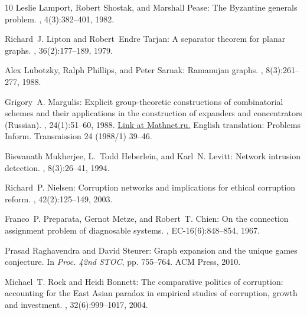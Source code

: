\documentclass[11pt]{article}
\numberwithin{equation}{section}
\theoremstyle{definition}
\theoremstyle{plain}
\begin{document}
\begin{thebibliography}{10}
{\sc Leslie Lamport, Robert Shostak, and Marshall Pease}: The {B}yzantine
  generals problem.
, 4(3):382--401, 1982.
\newblock [\epfmtdoi{10.1145/357172.357176}]

{\sc Richard~J. Lipton and Robert~Endre Tarjan}: A separator theorem for planar
  graphs.
, 36(2):177--189, 1979.
\newblock [\epfmtdoi{10.1137/0136016}]

{\sc Alex Lubotzky, Ralph Phillips, and Peter Sarnak}: Ramanujan graphs.
, 8(3):261--277, 1988.
\newblock [\epfmtdoi{10.1007/BF02126799}]

{\sc Grigory~A. Margulis}: Explicit group-theoretic constructions of
  combinatorial schemes and their applications in the construction of expanders
  and concentrators ({R}ussian).
, 24(1):51--60, 1988.
\newblock
  \href{http://www.mathnet.ru/php/archive.phtml?wshow=paper&jrnid=ppi&paperid=686&option_lang=eng}{Link
  at Mathnet.ru.} English translation: Problems Inform. Transmission 24
  (1988/1) 39--46.

{\sc Biswanath Mukherjee, L.~Todd Heberlein, and Karl~N. Levitt}: Network
  intrusion detection.
, 8(3):26--41, 1994.
\newblock [\epfmtdoi{10.1109/65.283931}]

{\sc Richard~P. Nielsen}: Corruption networks and implications for ethical
  corruption reform.
, 42(2):125--149, 2003.
\newblock [\epfmtdoi{10.1023/A:1021969204875}]

{\sc Franco~P. Preparata, Gernot Metze, and Robert~T. Chien}: On the connection
  assignment problem of diagnosable systems.
, EC-16(6):848--854, 1967.

{\sc Prasad Raghavendra and David Steurer}: Graph expansion and the unique
  games conjecture.
\newblock In {\em Proc. 42nd STOC}, pp. 755--764. ACM Press, 2010.
\newblock [\epfmtdoi{10.1145/1806689.1806792}]

{\sc Michael~T. Rock and Heidi Bonnett}: The comparative politics of
  corruption: accounting for the {E}ast {A}sian paradox in empirical studies of
  corruption, growth and investment.
, 32(6):999--1017, 2004.


\end{thebibliography}
\end{document}
